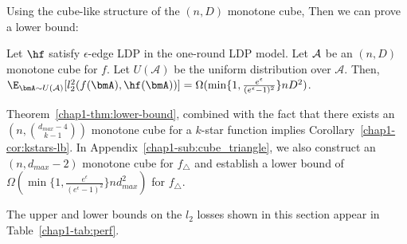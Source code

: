 Using 
the cube-like structure of the $(n,D)$ monotone cube, 
Then 
we can prove a lower
bound:
\begin{theorem}\label{chap1-thm:lower-bound}
  Let $\hf$ satisfy 
  $\epsilon$-edge LDP
  in the one-round 
  LDP
  model. Let $\cal{A}$ be an $(n,D)$ monotone cube for $f$. 
  Let $U(\mathcal{A})$ be the uniform distribution over $\mathcal{A}$. 
  Then,
  $\E_{\bmA \sim U(\mathcal{A})}[l_2^2(f(\bmA), \hf(\bmA))] =
  \Omega(\min\{1, \frac{e^\epsilon}{(e^\epsilon-1)^2}\}nD^2)$.
\end{theorem}


Theorem~\ref{chap1-thm:lower-bound}, combined with the fact that there exists an
$(n,\binom{d_{max}-4}{k-1})$ 
monotone cube for 
a $k$-star function 
implies Corollary~\ref{chap1-cor:kstars-lb}. 
In Appendix~\ref{chap1-sub:cube_triangle}, we also construct an $(n, d_{max}-2)$ monotone cube for
$f_\triangle$ and establish a lower bound of 
$\Omega(\min\{1, \frac{e^\epsilon}{(e^\epsilon-1)^2}\} nd_{max}^2)$ for
$f_\triangle$. 

The upper and lower bounds on the $l_2$ losses 
shown in
this section appear in Table~\ref{chap1-tab:perf}.
